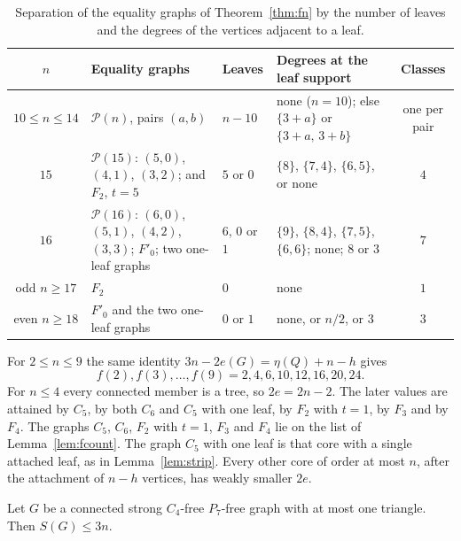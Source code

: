 \documentclass[ASNA]{USG}
\theoremstyle{WBstyletwo}
\numberwithin{equation}{section}
\begin{document}
\begin{table}[ht]
\centering\scriptsize
\begin{tabular}{@{}clllc@{}}
\toprule
$n$ & Equality graphs & Leaves & Degrees at the leaf support & Classes\\
\midrule
$10\le n\le 14$ & $\mathcal P(n)$, pairs $(a,b)$ & $n-10$ & none ($n=10$); else $\{3+a\}$ or $\{3+a,\,3+b\}$ & one per pair\\
$15$ & $\mathcal P(15)$: $(5,0)$, $(4,1)$, $(3,2)$; and $F_2$, $t=5$ & $5$ or $0$ & $\{8\}$, $\{7,4\}$, $\{6,5\}$, or none & $4$\\
$16$ & $\mathcal P(16)$: $(6,0)$, $(5,1)$, $(4,2)$, $(3,3)$; $F'_0$; two one-leaf graphs & $6$, $0$ or $1$ & $\{9\}$, $\{8,4\}$, $\{7,5\}$, $\{6,6\}$; none; $8$ or $3$ & $7$\\
odd $n\ge 17$ & $F_2$ & $0$ & none & $1$\\
even $n\ge 18$ & $F'_0$ and the two one-leaf graphs & $0$ or $1$ & none, or $n/2$, or $3$ & $3$\\
\bottomrule
\end{tabular}
\caption{Separation of the equality graphs of Theorem~\ref{thm:fn} by the number of leaves and the degrees of the vertices adjacent to a leaf.}
\label{tab:fnsep}
\end{table}



For $2\le n\le 9$ the same identity $3n-2e(G)=\eta(Q)+n-h$ gives
\[
f(2),f(3),\ldots,f(9)=2,4,6,10,12,16,20,24.
\]
For $n\le 4$ every connected member is a tree, so $2e=2n-2$. The later values are attained by $C_5$, by both $C_6$ and $C_5$ with one leaf, by $F_2$ with $t=1$, by $F_3$ and by $F_4$. The graphs $C_5$, $C_6$, $F_2$ with $t=1$, $F_3$ and $F_4$ lie on the list of Lemma~\ref{lem:fcount}. The graph $C_5$ with one leaf is that core with a single attached leaf, as in Lemma~\ref{lem:strip}. Every other core of order at most $n$, after the attachment of $n-h$ vertices, has weakly smaller $2e$.

\begin{theorem}\label{thm:onetri}
Let $G$ be a connected strong $C_4$-free $P_7$-free graph with at most one triangle. Then $S(G)\le 3n$.
\end{theorem}
\end{document}
